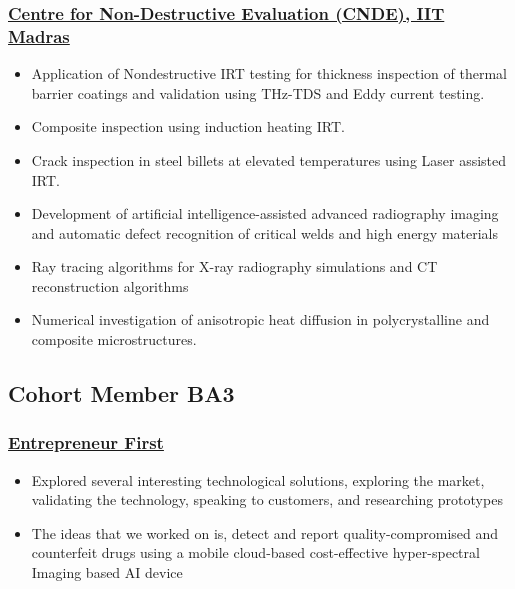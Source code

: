 \documentclass{my_cv}%
\begin{document}
\subsubsection{\href{https://www.cnde.in/}{Centre for Non-Destructive Evaluation (CNDE), IIT Madras}}
\begin{itemize}[leftmargin=0.15in]
\setlength\itemsep{-0.1em}
\color{mygray}
\item Application of Nondestructive IRT testing for thickness inspection of thermal barrier coatings and validation using THz-TDS and Eddy current testing.
\item Composite inspection using induction heating IRT.
\item Crack inspection in steel billets at elevated temperatures using Laser assisted IRT.
\item Development of artificial intelligence-assisted advanced radiography imaging and automatic defect recognition of critical welds and high energy materials
\item Ray tracing algorithms for X-ray radiography simulations and CT reconstruction algorithms
\item Numerical investigation of anisotropic heat diffusion in polycrystalline and composite microstructures.
\end{itemize}%
{\color{mygray1} \hdashrule[0.1ex]{18.8cm}{0.2mm}{1mm}}
\subsection{Cohort Member BA3}
\subsubsection{\href{https://www.joinef.com/}{Entrepreneur First}}
\begin{itemize}[leftmargin=0.15in]
\setlength\itemsep{-0.1em}
\color{mygray}
\item Explored several interesting technological solutions, exploring the market, validating the technology, speaking to customers, and researching prototypes
\item The ideas that we worked on is, detect and report quality-compromised and counterfeit drugs using a mobile cloud-based cost-effective hyper-spectral Imaging based AI device
\end{itemize}
{\color{mygray1} \hdashrule[0.1ex]{18.8cm}{0.2mm}{1mm}}
\end{document}

